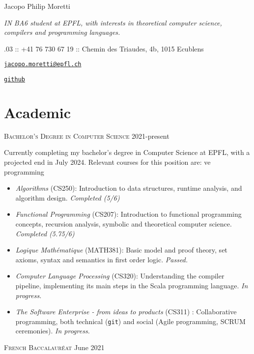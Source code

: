 \documentclass[10pt]{article}
\renewcommand{\url}[1]{{\texttt{#1}}}
\renewcommand{\line}[2]{{\vspace{4pt} \large \noindent\textsc{#1} \hfill #2}\vspace{4pt}}
\begin{document}
  \begin{center}
    \huge Jacopo Philip Moretti
  \end{center}

  \begin{adjustwidth}{1in}{1in}
    \textit{IN BA6 student at EPFL, with interests in theoretical computer science, compilers and programming languages.}

    .03 :: +41 76 730 67 19 :: Chemin des Triaudes, 4b, 1015 Ecublens
    
    \noindent \href{https://people.epfl.ch/jacopo.moretti}{\url{jacopo.moretti@epfl.ch}}
    
    \noindent \href{https://github.com/quartztz}{\url{github}}
  \end{adjustwidth}

  \section*{Academic}

  \line{Bachelor's Degree in Computer Science}{2021-present}

  Currently completing my bachelor's degree in Computer Science at EPFL, with a projected end in July 2024. Relevant courses for this position are: ve programming 
  \begin{itemize}
    \item \textit{Algorithms} (CS250): Introduction to data structures, runtime analysis, and algorithm design. \textit{Completed (5/6)}
    \item \textit{Functional Programming} (CS207): Introduction to functional programming concepts, recursion analysis, symbolic and theoretical computer science. \textit{Completed (5.75/6)}
    \item \textit{Logique Mathématique} (MATH381): Basic model and proof theory, set axioms, syntax and semantics in first order logic. \textit{Passed.}
    \item \textit{Computer Language Processing} (CS320): Understanding the compiler pipeline, implementing its main steps in the Scala programming language. \textit{In progress.}
    \item \textit{The Software Enterprise - from ideas to products} (CS311) : Collaborative programming, both technical (\texttt{git}) and social (Agile programming, SCRUM ceremonies). \textit{In progress.}
  \end{itemize}

  \line{French Baccalauréat}{June 2021}
\end{document}

